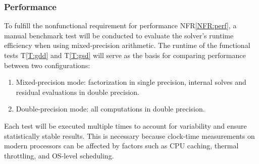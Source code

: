 \documentclass[12pt, titlepage]{article}
\newcommand{\tref}[1]{T\ref{#1}}
\newcommand{\nfrref}[1]{NFR\ref{#1}}
\begin{document}
\subsubsection{Performance}

To fulfill the nonfunctional requirement for performance \nfrref{NFR:perf}, a
manual benchmark test will be conducted to evaluate the solver’s runtime
efficiency when using mixed-precision arithmetic. The runtime of the functional
tests \tref{T:gdd} and \tref{T:gsd} will serve as the basis for comparing
performance between two configurations:
\begin{enumerate}
\item Mixed-precision mode: factorization in single precision, internal solves and
  residual evaluations in double precision.
\item Double-precision mode: all computations in double precision.
\end{enumerate}
Each test will be executed multiple times to account for variability and ensure
statistically stable results. This is necessary because clock-time measurements
on modern processors can be affected by factors such as CPU caching, thermal
throttling, and OS-level scheduling.
\end{document}

